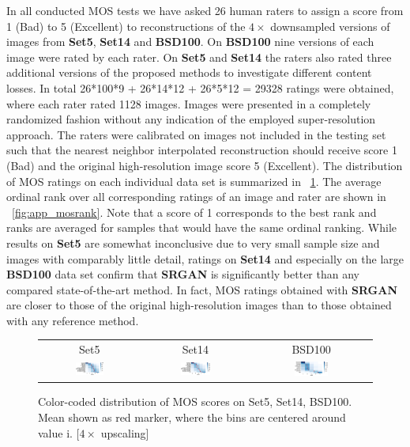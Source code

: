 \documentclass[10pt,twocolumn,letterpaper]{article}
\begin{document}
In all conducted \ac{MOS} tests we have asked 26 human raters to assign a score from 1 (Bad) to 5 (Excellent) to reconstructions of the $4\times$ downsampled versions of images from \textbf{Set5}, \textbf{Set14} and \textbf{BSD100}. On \textbf{BSD100} nine versions of each image were rated by each rater. On \textbf{Set5} and \textbf{Set14} the raters also rated three additional versions of the proposed methods to investigate different content losses. In total 26*100*9 + 26*14*12 + 26*5*12 = 29328 ratings were obtained, where each rater rated 1128 images. Images were presented in a completely randomized fashion without any indication of the employed super-resolution approach. The raters were calibrated on images not included in the testing set such that the nearest neighbor interpolated reconstruction should receive score 1 (Bad) and the original high-resolution image score 5 (Excellent).
The distribution of \ac{MOS} ratings on each individual data set is summarized in \figurename~\ref{fig:app_mosdist}. The average ordinal rank over all corresponding ratings of an image and rater are shown in \figurename~\ref{fig:app_mosrank}. Note that a score of 1 corresponds to the best rank and ranks are averaged for samples that would have the same ordinal ranking.
While results on \textbf{Set5} are somewhat inconclusive due to very small sample size and images with comparably little detail, ratings on \textbf{Set14} and especially on the large \textbf{BSD100} data set confirm that \textbf{SRGAN} is significantly better than any compared state-of-the-art method. In fact, \ac{MOS} ratings obtained with \textbf{SRGAN} are closer to those of the original high-resolution images than to those obtained with any reference method.
\begin{figure}[h!]
\begin{tabular}{ccc}
Set5 & Set14 & BSD100 \\
\includegraphics[width=0.3\textwidth]{images/used/appendix/jpg/MOS/MOS_heatmap_Set5_cropped}&
\includegraphics[width=0.3\textwidth]{images/used/appendix/jpg/MOS/MOS_heatmap_Set14_cropped} &
\includegraphics[width=0.3\textwidth]{images/used/appendix/jpg/MOS/MOS_heatmap_BSD100_cropped} \\
\end{tabular}
\caption{Color-coded distribution of MOS scores on Set5, Set14, BSD100. Mean shown as red marker, where the bins are centered around value i. [$4\times$ upscaling]}
\label{fig:app_mosdist}
\end{figure}
\end{document}

